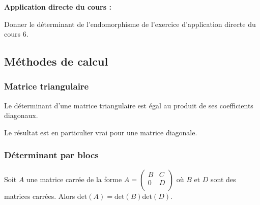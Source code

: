 \documentclass[french,11pt,twoside]{VcCours}
\newenvironment{ApplicationDirecte}{\textbf{Application directe du cours :}

}{}
\begin{document}
\begin{ApplicationDirecte} Donner le déterminant de l'endomorphisme de l'exercice d'application directe du cours $6$.
\end{ApplicationDirecte}

\subsection{Méthodes de calcul}
\subsubsection{Matrice triangulaire}

\begin{Proposition}{} Le déterminant d'une matrice triangulaire est égal au produit de ses coefficients diagonaux.
\end{Proposition}

\begin{Remarque}{} Le résultat est en particulier vrai pour une matrice diagonale.
\end{Remarque}

\subsubsection{Déterminant par blocs}

\begin{Proposition}{} Soit $A$ une matrice carrée de la forme $A = \begin{pmatrix}
B & C \\
0 & D \\
\end{pmatrix}$ où $B$ et $D$ sont des matrices carrées. Alors \newline $\textrm{det}(A)= \textrm{det}(B) \textrm{det}(D)$.
\end{Proposition}
\end{document}
